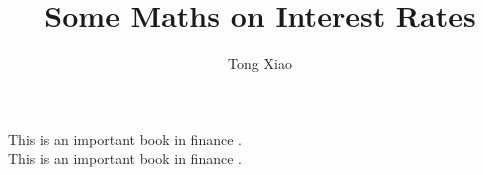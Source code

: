 \documentclass[a4paper, 12pt]{article}
\title{\vspace{-4em}Some Maths on Interest Rates}
\author{Tong Xiao}
\affil{Imperial College London}
\theoremstyle{remark}
\theoremstyle{definition}
\numberwithin{equation}{section}
\begin{document}
\setlength{\abovedisplayskip}{7.5pt}  %
\setlength{\belowdisplayskip}{7.5pt}  %
\setlength{\abovedisplayshortskip}{2pt}
\setlength{\belowdisplayshortskip}{2pt}

\maketitle

\vspace{-2em}

\tableofcontents

\thispagestyle{empty}

\newpage





\appendix
This is an important book in finance \cite{BrigoMercurio2006}.\\
This is an important book in finance \cite{PolynomialAutomorphisms2021}.\\
% 

\printbibliography
\end{document}
